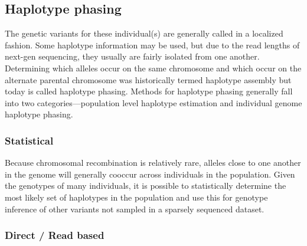 \subsection{Haplotype phasing}\label{section:phasing}

\par{
The genetic variants for these individual(s) are generally called in a localized fashion. Some haplotype information may be used, but due to the read lengths of next-gen sequencing, they usually are fairly isolated from one another. Determining which alleles occur on the same chromosome and which occur on the alternate parental chromosome was historically termed haplotype assembly but today is called haplotype phasing. Methods for haplotype phasing generally fall into two categories---population level haplotype estimation and individual genome haplotype phasing. 
}

\subsubsection{Statistical}

\par{
Because chromosomal recombination is relatively rare, alleles close to one another in the genome will generally cooccur across individuals in the population. Given the genotypes of many individuals, it is possible to statistically determine the most likely set of haplotypes in the population\cite{shapeit4} and use this for genotype inference of other variants not sampled in a sparsely sequenced dataset.
}

\subsubsection{Direct / Read based}

